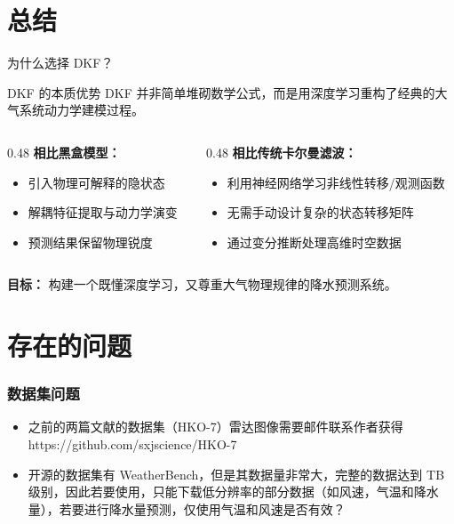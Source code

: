 \documentclass[10pt,aspectratio=1610]{beamer}
\begin{document}
\section{总结}

\begin{frame}{为什么选择 DKF？}
    \begin{block}{DKF 的本质优势}
        DKF 并非简单堆砌数学公式，而是用深度学习\alert{重构了经典的大气系统动力学建模过程}。
    \end{block}
    \vspace{0.3cm}
    \begin{columns}
        \begin{column}{0.48\textwidth}
            \textbf{相比黑盒模型：}
            \begin{itemize}
                \item 引入物理可解释的隐状态
                \item 解耦特征提取与动力学演变
                \item 预测结果保留物理锐度
            \end{itemize}
        \end{column}
        \begin{column}{0.48\textwidth}
            \textbf{相比传统卡尔曼滤波：}
            \begin{itemize}
                \item 利用神经网络学习非线性转移/观测函数
                \item 无需手动设计复杂的状态转移矩阵
                \item 通过变分推断处理高维时空数据
            \end{itemize}
        \end{column}
    \end{columns}
    \vspace{0.5cm}
    \begin{center}
        \textbf{目标：} 构建一个既懂深度学习，又尊重大气物理规律的降水预测系统。
    \end{center}
\end{frame}

\section{存在的问题}
\begin{frame}
    \frametitle{数据集问题}
    \begin{itemize}
        \item 之前的两篇文献的数据集（HKO-7）雷达图像需要邮件联系作者获得 https://github.com/sxjscience/HKO-7
        \item 开源的数据集有 WeatherBench，但是其数据量非常大，完整的数据达到 TB 级别，因此若要使用，只能下载低分辨率的部分数据（如风速，气温和降水量），若要进行降水量预测，仅使用气温和风速是否有效？
    \end{itemize}
\end{frame}
\end{document}
